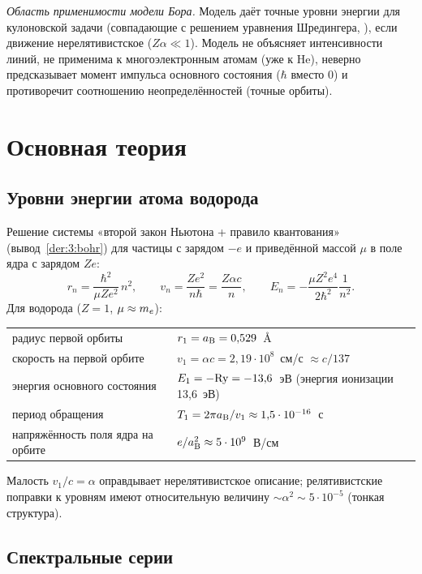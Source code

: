 \emph{Область применимости модели Бора.} Модель даёт точные уровни энергии для кулоновской
задачи (совпадающие с решением уравнения Шредингера, ), если движение
нерелятивистское ($Z\alpha\ll1$). Модель не объясняет интенсивности линий, не применима к
многоэлектронным атомам (уже к He), неверно предсказывает момент импульса основного
состояния ($\hbar$ вместо 0) и противоречит соотношению неопределённостей (точные орбиты).

\section{Основная теория}

\subsection{Уровни энергии атома водорода}

Решение системы «второй закон Ньютона + правило квантования» (вывод~\ref{der:3:bohr})
для частицы с зарядом $-e$ и приведённой массой $\mu$ в поле ядра с зарядом $Ze$:
\begin{equation}\label{eq:3:levels}
  r_n=\frac{\hbar^2}{\mu Ze^2}\,n^2,\qquad
  v_n=\frac{Ze^2}{n\hbar}=\frac{Z\alpha c}{n},\qquad
  E_n=-\frac{\mu Z^2e^4}{2\hbar^2}\frac{1}{n^2}.
\end{equation}
Для водорода ($Z=1$, $\mu\approx m_e$):
\begin{center}
\begin{tabular}{@{}ll@{}}
\toprule
радиус первой орбиты & $r_1=a_{\mathrm B}=0{,}529$~Å \\
скорость на первой орбите & $v_1=\alpha c=2{,}19\cdot10^8$~см/с $\approx c/137$ \\
энергия основного состояния & $E_1=-\mathrm{Ry}=-13{,}6$~эВ (энергия ионизации 13{,}6~эВ) \\
период обращения & $T_1=2\pi a_{\mathrm B}/v_1\approx1{,}5\cdot10^{-16}$~с \\
напряжённость поля ядра на орбите & $e/a_{\mathrm B}^2\approx5\cdot10^9$~В/см \\
\bottomrule
\end{tabular}
\end{center}
Малость $v_1/c=\alpha$ оправдывает нерелятивистское описание; релятивистские поправки к уровням
имеют относительную величину $\sim\alpha^2\sim5\cdot10^{-5}$ (тонкая структура).

\subsection{Спектральные серии}

